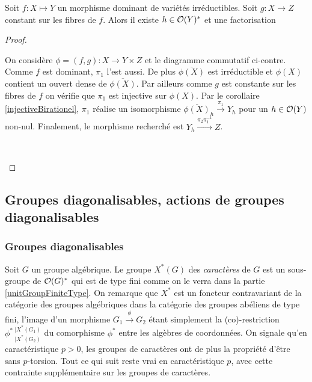 \begin{lem}\label{factoInvariantFibers}
Soit $f:X \mapsto Y$ un morphisme dominant de variétés irréductibles. Soit $g:X \rightarrow Z$ constant sur les fibres de $f$. Alors il existe $h\in \mathcal{O}(Y)^*$ et une factorisation
\end{lem}
\begin{proof}
	\begin{multicols}{2}
	On considère $\phi=(f,g):X\rightarrow Y\times Z$ et le diagramme commutatif ci-contre. Comme $f$ est dominant, $\pi_1$ l'est aussi. De plus $\overline{\phi(X)}$ est irréductible et $\phi(X)$ contient un ouvert dense de $\overline{\phi(X)}$. Par ailleurs comme $g$ est constante sur les fibres de $f$ on vérifie que $\pi_1$ est injective sur $\phi(X)$. Par le corollaire \ref{injectiveBirationel}, $\pi_1$ réalise un isomorphisme $\overline{\phi(X)}_h \xrightarrow{\pi_1} Y_h$ pour un $h\in \mathcal{O}(Y)$ non-nul. Finalement, le morphisme recherché est  $Y_h \xrightarrow{\pi_2\pi_1^{-1}} Z$.
	
	\columnbreak
	\begin{center}
	\\
	\end{center}
	\end{multicols}
\end{proof}


\subsection{Groupes diagonalisables, actions de groupes diagonalisables}
\label{GroupesDiag}
\subsubsection{Groupes diagonalisables}
Soit $G$ un groupe algébrique. Le groupe $X^*(G)$ des \textit{caractères} de $G$ est un sous-groupe de $\mathcal{O}(G)^*$ qui est de type fini comme on le verra dans la partie \ref{unitGroupFiniteType}. On remarque que $X^*$ est un foncteur contravariant de la catégorie des groupes algébriques dans la catégorie des groupes abéliens de type fini, l'image d'un morphisme $G_1\xrightarrow{\phi}G_2$ étant simplement la (co)-restriction $\phi^* \,_{|X^*(G_2)}^{|X^*(G_1)}$ du comorphisme $\phi^*$ entre les algèbres de coordonnées. On signale qu'en caractéristique $p>0$, les groupes de caractères ont de plus la propriété d'être sans $p$-torsion. Tout ce qui suit reste vrai en caractéristique $p$, avec cette contrainte supplémentaire sur les groupes de caractères.

